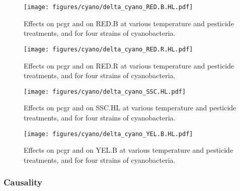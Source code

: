 \begin{figure}[hbt!]
    \centering
    \texttt{[image: figures/cyano/delta\_cyano\_RED.B.HL.pdf]}
    \caption{Effects on pcgr and on RED.B at various temperature and pesticide treatments, and for four strains of cyanobacteria.}
    \label{fig:delta_cyano_RED.B.HL}
\end{figure}

\begin{figure}[hbt!]
    \centering
    \texttt{[image: figures/cyano/delta\_cyano\_RED.R.HL.pdf]}
    \caption{Effects on pcgr and on RED.R at various temperature and pesticide treatments, and for four strains of cyanobacteria.}
    \label{fig:delta_cyano_RED.R.HL}
\end{figure}

\begin{figure}[hbt!]
    \centering
    \texttt{[image: figures/cyano/delta\_cyano\_SSC.HL.pdf]}
    \caption{Effects on pcgr and on SSC.HL at various temperature and pesticide treatments, and for four strains of cyanobacteria.}
    \label{fig:delta_cyano_SSC.HL}
\end{figure}

\begin{figure}[hbt!]
    \centering
    \texttt{[image: figures/cyano/delta\_cyano\_YEL.B.HL.pdf]}
    \caption{Effects on pcgr and on YEL.B at various temperature and pesticide treatments, and for four strains of cyanobacteria.}
    \label{fig:delta_cyano_YEL.B.HL}
\end{figure}

\subsubsection{Causality}


\clearpage

